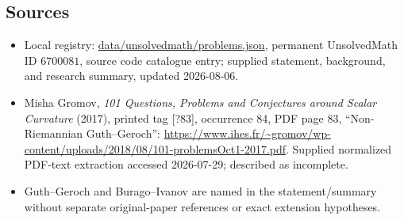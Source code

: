 \documentclass[11pt]{article}
\begin{document}
\subsection{Sources}
\begin{itemize}
\item Local registry: \url{data/unsolvedmath/problems.json}, permanent UnsolvedMath ID \(6700081\), source code catalogue entry; supplied statement, background, and research summary, updated 2026-08-06.
\item Misha Gromov, \emph{101 Questions, Problems and Conjectures around Scalar Curvature} (2017), printed tag [?83], occurrence 84, PDF page 83, ``Non-Riemannian Guth--Geroch'': \url{https://www.ihes.fr/~gromov/wp-content/uploads/2018/08/101-problemsOct1-2017.pdf}. Supplied normalized PDF-text extraction accessed 2026-07-29; described as incomplete.
\item Guth--Geroch and Burago--Ivanov are named in the statement/summary without separate original-paper references or exact extension hypotheses.
\end{itemize}
\end{document}
